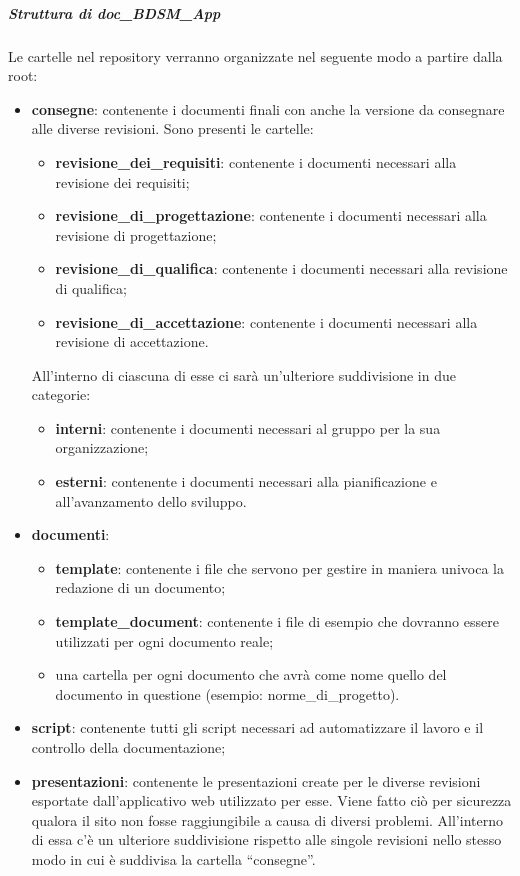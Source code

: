 				\subparagraph{Struttura di doc\_BDSM\_App}
				Le cartelle nel repository verranno organizzate nel seguente modo a partire dalla root:
					\begin{itemize}
						\item \textbf{consegne}: contenente i documenti finali con anche la versione da consegnare alle diverse revisioni. Sono presenti le cartelle:
							\begin{itemize}
								\item \textbf{revisione\_dei\_requisiti}: contenente i documenti necessari alla revisione dei requisiti;
								\item \textbf{revisione\_di\_progettazione}: contenente i documenti necessari alla revisione di progettazione;
								\item \textbf{revisione\_di\_qualifica}: contenente i documenti necessari alla revisione di qualifica;
								\item \textbf{revisione\_di\_accettazione}: contenente i documenti necessari alla revisione di accettazione.
							\end{itemize}
						\noindent
						All'interno di ciascuna di esse ci sarà un'ulteriore suddivisione in due categorie:
							\begin{itemize}
								\item \textbf{interni}: contenente i documenti necessari al gruppo per la sua organizzazione;
								\item \textbf{esterni}: contenente i documenti necessari alla pianificazione e all'avanzamento dello sviluppo.
							\end{itemize}

						\item \textbf{documenti}:
							\begin{itemize}
								\item \textbf{template}: contenente i file che servono per gestire in maniera univoca la redazione di un documento;
								\item \textbf{template\_document}: contenente i file di esempio che dovranno essere utilizzati per ogni documento reale;
								\item una cartella per ogni documento che avrà come nome quello del documento in questione (esempio: norme\_di\_progetto).
							\end{itemize}

						\item \textbf{script}: contenente tutti gli script necessari ad automatizzare il lavoro e il controllo della documentazione;
						\item \textbf{presentazioni}: contenente le presentazioni create per le diverse revisioni esportate dall'applicativo web utilizzato per esse. Viene fatto ciò per sicurezza qualora il sito non fosse raggiungibile a causa di diversi problemi. All'interno di essa c'è un ulteriore suddivisione rispetto alle singole revisioni nello stesso modo in cui è suddivisa la cartella ``consegne''.
					\end{itemize}

